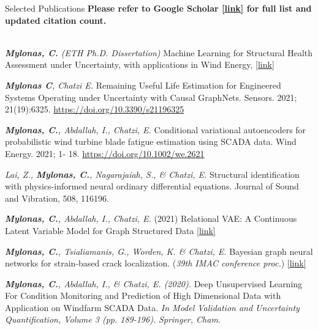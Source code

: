 \documentclass{resume_v2} %
\begin{document}
\begin{rSection}{Selected Publications}
  \newcommand{\myvspace}{\vspace{-3pt}}
\def\arraystretch{1.0}
\textbf{Please refer to  Google Scholar \href{https://scholar.google.com/citations?user=W7giwJEAAAAJ}{[link]} for full list and updated citation count.} \\ \\
  \small{
    \textit{\textbf{Mylonas, C.} (ETH Ph.D. Dissertation)} Machine Learning for Structural Health Assessment under Uncertainty, with applications in Wind Energy, \href{https://www.research-collection.ethz.ch/handle/20.500.11850/511551}{[link]}

    \textit{\textbf{Mylonas C}, Chatzi E.} Remaining Useful Life Estimation for Engineered Systems Operating under Uncertainty with Causal GraphNets. Sensors. 2021; 21(19):6325. \href{https://doi.org/10.3390/s21196325}{https://doi.org/10.3390/s21196325}

    \textit{\textbf{Mylonas, C.}, Abdallah, I., Chatzi, E.} Conditional variational autoencoders for probabilistic wind turbine blade fatigue estimation using SCADA data. Wind Energy. 2021; 1‐ 18. \href{https://doi.org/10.1002/we.2621}{https://doi.org/10.1002/we.2621}

 \textit{Lai, Z., \textbf{Mylonas, C.}, Nagarajaiah, S., \& Chatzi, E.} Structural identification with physics-informed neural ordinary differential equations. Journal of Sound and Vibration, 508, 116196. 

    \textit{\textbf{Mylonas, C.}, Abdallah, I., Chatzi, E.} (2021) Relational VAE: A Continuous Latent Variable Model for 
    Graph Structured Data \href{https://arxiv.org/abs/2106.16049}{[link]}

\textit{\textbf{Mylonas, C.}, Tsialiamanis, G., Worden, K. \& Chatzi, E. } Bayesian graph neural networks for 
strain-based crack localization.  (\textit{39th IMAC conference proc.}) \href{https://arxiv.org/abs/2012.06791}{[link]}

\textit{\textbf{Mylonas, C.}, Abdallah, I., \& Chatzi, E. (2020).} Deep Unsupervised Learning For Condition
Monitoring and Prediction of High Dimensional Data with Application on Windfarm SCADA Data. \textit{In Model Validation and Uncertainty Quantification, Volume 3 (pp. 189-196).} \textit{Springer, Cham.}
}

\end{rSection}
\end{document}
